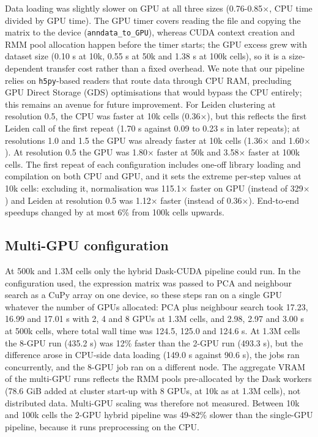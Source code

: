 \documentclass[runningheads]{llncs}
\begin{document}
Data loading was slightly slower on GPU at all three sizes (0.76-0.85$\times$, CPU time divided by GPU time). The GPU timer covers reading the file and copying the matrix to the device (\texttt{anndata\_\allowbreak{}to\_\allowbreak{}GPU}), whereas CUDA context creation and RMM pool allocation happen before the timer starts; the GPU excess grew with dataset size (0.10 s at 10k, 0.55 s at 50k and 1.38 s at 100k cells), so it is a size-dependent transfer cost rather than a fixed overhead. We note that our pipeline relies on \texttt{h5py}-based readers that route data through CPU RAM, precluding GPU Direct Storage (GDS) optimisations that would bypass the CPU entirely; this remains an avenue for future improvement. For Leiden clustering at resolution 0.5, the CPU was faster at 10k cells (0.36$\times$), but this reflects the first Leiden call of the first repeat (1.70 s against 0.09 to 0.23 s in later repeats); at resolutions 1.0 and 1.5 the GPU was already faster at 10k cells (1.36$\times$ and 1.60$\times$). At resolution 0.5 the GPU was 1.80$\times$ faster at 50k and 3.58$\times$ faster at 100k cells. The first repeat of each configuration includes one-off library loading and compilation on both CPU and GPU, and it sets the extreme per-step values at 10k cells: excluding it, normalisation was 115.1$\times$ faster on GPU (instead of 329$\times$) and Leiden at resolution 0.5 was 1.12$\times$ faster (instead of 0.36$\times$). End-to-end speedups changed by at most 6\% from 100k cells upwards.

\hypertarget{multi-gpu-configuration-1}{%
\subsection{Multi-GPU configuration}\label{multi-gpu-configuration-1}}

At 500k and 1.3M cells only the hybrid Dask-CUDA pipeline could run. In the configuration used, the expression matrix was passed to PCA and neighbour search as a CuPy array on one device, so these steps ran on a single GPU whatever the number of GPUs allocated: PCA plus neighbour search took 17.23, 16.99 and 17.01 s with 2, 4 and 8 GPUs at 1.3M cells, and 2.98, 2.97 and 3.00 s at 500k cells, where total wall time was 124.5, 125.0 and 124.6 s. At 1.3M cells the 8-GPU run (435.2 s) was 12\% faster than the 2-GPU run (493.3 s), but the difference arose in CPU-side data loading (149.0 s against 90.6 s), the jobs ran concurrently, and the 8-GPU job ran on a different node. The aggregate VRAM of the multi-GPU runs reflects the RMM pools pre-allocated by the Dask workers (78.6 GiB added at cluster start-up with 8 GPUs, at 10k as at 1.3M cells), not distributed data. Multi-GPU scaling was therefore not measured. Between 10k and 100k cells the 2-GPU hybrid pipeline was 49-82\% slower than the single-GPU pipeline, because it runs preprocessing on the CPU.
\end{document}
